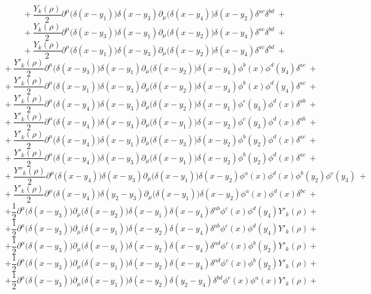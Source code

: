 $$+\ \frac{Y_k(\rho)}{2}\partial^\mu\big(\delta(x - y_1)\big)\delta(x - y_3)\partial_\mu\big(\delta(x - y_4)\big)\delta(x - y_2)\delta^{ac}\delta^{bd} \ +$$
$$+\ \frac{Y_k(\rho)}{2}\partial^\mu\big(\delta(x - y_3)\big)\delta(x - y_1)\partial_\mu\big(\delta(x - y_2)\big)\delta(x - y_4)\delta^{ac}\delta^{bd} \ +$$
$$+\ \frac{Y_k(\rho)}{2}\partial^\mu\big(\delta(x - y_1)\big)\delta(x - y_3)\partial_\mu\big(\delta(x - y_2)\big)\delta(x - y_4)\delta^{ac}\delta^{bd} \ +$$
$$+\ \frac{Y'_k(\rho)}{2}\partial^\mu\big(\delta(x - y_3)\big)\delta(x - y_1)\partial_\mu\big(\delta(x - y_2)\big)\delta(x - y_4)\phi^b(x)\phi^d(y_4)\delta^{ac} \ +$$
$$+\ \frac{Y'_k(\rho)}{2}\partial^\mu\big(\delta(x - y_1)\big)\delta(x - y_3)\partial_\mu\big(\delta(x - y_2)\big)\delta(x - y_4)\phi^b(x)\phi^d(y_4)\delta^{ac} \ +$$
$$+\ \frac{Y'_k(\rho)}{2}\partial^\mu\big(\delta(x - y_4)\big)\delta(x - y_3)\partial_\mu\big(\delta(x - y_2)\big)\delta(x - y_1)\phi^c(y_3)\phi^d(x)\delta^{ab} \ +$$
$$+\ \frac{Y'_k(\rho)}{2}\partial^\mu\big(\delta(x - y_4)\big)\delta(x - y_3)\partial_\mu\big(\delta(x - y_1)\big)\delta(x - y_2)\phi^c(y_3)\phi^d(x)\delta^{ab} \ +$$
$$+\ \frac{Y'_k(\rho)}{2}\partial^\mu\big(\delta(x - y_4)\big)\delta(x - y_1)\partial_\mu\big(\delta(x - y_3)\big)\delta(x - y_2)\phi^b(y_2)\phi^d(x)\delta^{ac} \ +$$
$$+\ \frac{Y'_k(\rho)}{2}\partial^\mu\big(\delta(x - y_4)\big)\delta(x - y_3)\partial_\mu\big(\delta(x - y_1)\big)\delta(x - y_2)\phi^b(y_2)\phi^d(x)\delta^{ac} \ +$$
$$+\ \frac{Y''_k(\rho)}{2}\partial^\mu\big(\delta(x - y_4)\big)\delta(x - y_3)\partial_\mu\big(\delta(x - y_1)\big)\delta(x - y_2)\phi^a(x)\phi^d(x)\phi^b(y_2)\phi^c(y_3) \ +$$
$$+\ \frac{Y'_k(\rho)}{2}\partial^\mu\big(\delta(x - y_4)\big)\delta(y_2 - y_3)\partial_\mu\big(\delta(x - y_1)\big)\delta(x - y_2)\phi^a(x)\phi^d(x)\delta^{bc} \ +$$
$$+ \frac{1}{2}\partial^\mu\big(\delta(x - y_3)\big)\partial_\mu\big(\delta(x - y_2)\big)\delta(x - y_1)\delta(x- y_4)\delta^{ab}\phi^c(x)\phi^d(y_4)Y'_k(\rho) + $$
$$+ \frac{1}{2}\partial^\mu\big(\delta(x - y_3)\big)\partial_\mu\big(\delta(x - y_1)\big)\delta(x - y_2)\delta(x- y_4)\delta^{ab}\phi^c(x)\phi^d(y_4)Y'_k(\rho) + $$
$$+ \frac{1}{2}\partial^\mu\big(\delta(x - y_3)\big)\partial_\mu\big(\delta(x - y_1)\big)\delta(x - y_2)\delta(x- y_4)\delta^{ad}\phi^c(x)\phi^b(y_2)Y'_k(\rho) + $$
$$+ \frac{1}{2}\partial^\mu\big(\delta(x - y_3)\big)\partial_\mu\big(\delta(x - y_1)\big)\delta(x - y_2)\delta(x- y_4)\delta^{ad}\phi^c(x)\phi^b(y_2)Y'_k(\rho) + $$
$$+ \frac{1}{2}\partial^\mu\big(\delta(x - y_3)\big)\partial_\mu\big(\delta(x - y_1)\big)\delta(x - y_2)\delta(y_2- y_4)\delta^{bd}\phi^c(x)\phi^a(x)Y'_k(\rho) + $$
